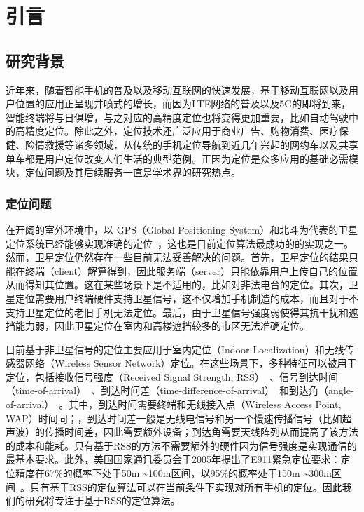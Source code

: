 \chapter{引言}
\label{cha:intro}

\section{研究背景}
近年来，随着智能手机的普及以及移动互联网的快速发展，基于移动互联网以及用户位置的应用正呈现井喷式的增长，而因为LTE网络的普及以及5G的即将到来，智能终端将与日俱增，与之对应的高精度定位也将变得更加重要，比如自动驾驶中的高精度定位。除此之外，定位技术还广泛应用于商业广告、购物消费、医疗保健、险情救援等诸多领域，从传统的手机定位导航到近几年兴起的网约车以及共享单车都是用户定位改变人们生活的典型范例。正因为定位是众多应用的基础必需模块，定位问题及其后续服务一直是学术界的研究热点。

\subsection{定位问题}

在开阔的室外环境中，以 GPS（Global  Positioning System）和北斗为代表的卫星定位系统已经能够实现准确的定位~\cite{xiao2016survey}，这也是目前定位算法最成功的的实现之一。然而，卫星定位仍然存在一些目前无法妥善解决的问题。首先，卫星定位的结果只能在终端（client）解算得到，因此服务端（server）只能依靠用户上传自己的位置从而得知其位置。这在某些场景下是不适用的，比如对非法电台的定位。其次，卫星定位需要用户终端硬件支持卫星信号，这不仅增加手机制造的成本，而且对于不支持卫星定位的老旧手机无法定位。最后，由于卫星信号强度弱使得其抗干扰和遮挡能力弱，因此卫星定位在室内和高楼遮挡较多的市区无法准确定位。

目前基于非卫星信号的定位主要应用于室内定位（Indoor Localization）和无线传感器网络（Wireless Sensor Network）定位。在这些场景下，多种特征可以被用于定位，包括接收信号强度（Received Signal Strength, RSS）~\cite{vaghefi2013cooperative, jackson2011received, liu2006analysis, bahl2000radar}、信号到达时间（time-of-arrival）~\cite{guvenc2009survey}、到达时间差（time-difference-of-arrival）~\cite{catovic2004cramer}和到达角（angle-of-arrival）~\cite{cong2002hybrid}。其中，到达时间需要终端和无线接入点（Wireless Access Point, WAP）时间同；，到达时间差一般是无线电信号和另一个慢速传播信号（比如超声波）的传播时间差，因此需要额外设备；到达角需要天线阵列从而提高了该方法的成本和能耗。只有基于RSS的方法不需要额外的硬件因为信号强度是实现通信的最基本要求。此外，美国国家通讯委员会于2005年提出了E911紧急定位要求：定位精度在67\%的概率下处于50m \textasciitilde 100m区间，以95\%的概率处于150m \textasciitilde 300m区间~\cite{junglas2008location}。只有基于RSS的定位算法可以在当前条件下实现对所有手机的定位。因此我们的研究将专注于基于RSS的定位算法。


